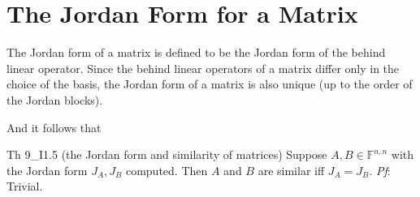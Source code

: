 \documentclass{article}
\begin{document}
\section{The Jordan Form for a Matrix}
\textcolor{Df}{The Jordan form of a matrix is defined to be the Jordan form of the behind linear operator.} \textcolor{Th}{Since the behind linear operators of a matrix differ only in the choice of the basis, the Jordan form of a matrix is also unique (up to the order of the Jordan blocks)}.

And it follows that

\begin{Th}{Th 9\_I1.5 (the Jordan form and similarity of matrices)}
    Suppose $A, B\in\mathbb{F}^{n,n}$ with the Jordan form $J_A, J_B$ computed. Then $A$ and $B$ are similar iff $J_A = J_B$.
    \tcblower
    \textit{Pf}: Trivial. 
\end{Th}
\end{document}
